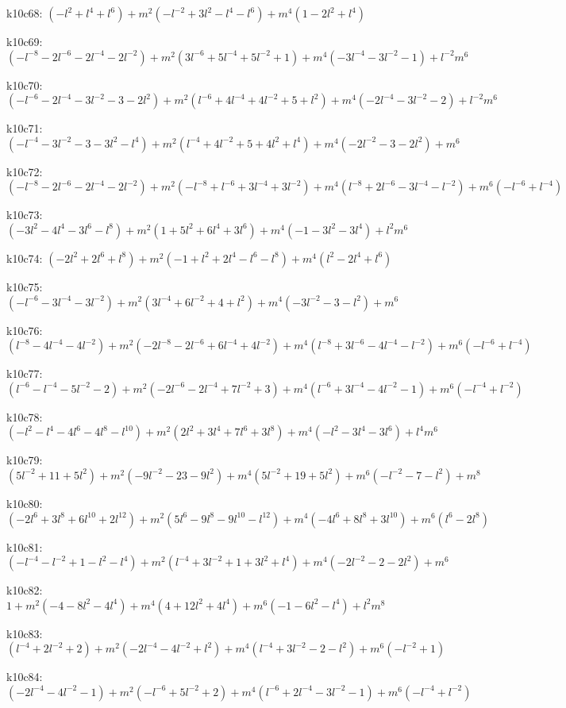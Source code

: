k10c68: $ (-l^{2}+l^{4}+l^{6})  +m^{2}(-l^{-2}+3l^{2}-l^{4}-l^{6})  +m^{4}(1-2l^{2}+l^{4}) $ 

k10c69: $ (-l^{-8}-2l^{-6}-2l^{-4}-2l^{-2})  +m^{2}(3l^{-6}+5l^{-4}+5l^{-2}+1)  +m^{4}(-3l^{-4}-3l^{-2}-1)  +l^{-2}m^{6} $ 

k10c70: $ (-l^{-6}-2l^{-4}-3l^{-2}-3-2l^{2})  +m^{2}(l^{-6}+4l^{-4}+4l^{-2}+5+l^{2})  +m^{4}(-2l^{-4}-3l^{-2}-2)  +l^{-2}m^{6} $ 

k10c71: $ (-l^{-4}-3l^{-2}-3-3l^{2}-l^{4})  +m^{2}(l^{-4}+4l^{-2}+5+4l^{2}+l^{4})  +m^{4}(-2l^{-2}-3-2l^{2})  +m^{6} $ 

k10c72: $ (-l^{-8}-2l^{-6}-2l^{-4}-2l^{-2})  +m^{2}(-l^{-8}+l^{-6}+3l^{-4}+3l^{-2})  +m^{4}(l^{-8}+2l^{-6}-3l^{-4}-l^{-2})  +m^{6}(-l^{-6}+l^{-4}) $ 

k10c73: $ (-3l^{2}-4l^{4}-3l^{6}-l^{8})  +m^{2}(1+5l^{2}+6l^{4}+3l^{6})  +m^{4}(-1-3l^{2}-3l^{4})  +l^{2}m^{6} $ 

k10c74: $ (-2l^{2}+2l^{6}+l^{8})  +m^{2}(-1+l^{2}+2l^{4}-l^{6}-l^{8})  +m^{4}(l^{2}-2l^{4}+l^{6}) $ 

k10c75: $ (-l^{-6}-3l^{-4}-3l^{-2})  +m^{2}(3l^{-4}+6l^{-2}+4+l^{2})  +m^{4}(-3l^{-2}-3-l^{2})  +m^{6} $ 

k10c76: $ (l^{-8}-4l^{-4}-4l^{-2})  +m^{2}(-2l^{-8}-2l^{-6}+6l^{-4}+4l^{-2})  +m^{4}(l^{-8}+3l^{-6}-4l^{-4}-l^{-2})  +m^{6}(-l^{-6}+l^{-4}) $ 

k10c77: $ (l^{-6}-l^{-4}-5l^{-2}-2)  +m^{2}(-2l^{-6}-2l^{-4}+7l^{-2}+3)  +m^{4}(l^{-6}+3l^{-4}-4l^{-2}-1)  +m^{6}(-l^{-4}+l^{-2}) $ 

k10c78: $ (-l^{2}-l^{4}-4l^{6}-4l^{8}-l^{10})  +m^{2}(2l^{2}+3l^{4}+7l^{6}+3l^{8})  +m^{4}(-l^{2}-3l^{4}-3l^{6})  +l^{4}m^{6} $ 

k10c79: $ (5l^{-2}+11+5l^{2})  +m^{2}(-9l^{-2}-23-9l^{2})  +m^{4}(5l^{-2}+19+5l^{2})  +m^{6}(-l^{-2}-7-l^{2})  +m^{8} $ 

k10c80: $ (-2l^{6}+3l^{8}+6l^{10}+2l^{12})  +m^{2}(5l^{6}-9l^{8}-9l^{10}-l^{12})  +m^{4}(-4l^{6}+8l^{8}+3l^{10})  +m^{6}(l^{6}-2l^{8}) $ 

k10c81: $ (-l^{-4}-l^{-2}+1-l^{2}-l^{4})  +m^{2}(l^{-4}+3l^{-2}+1+3l^{2}+l^{4})  +m^{4}(-2l^{-2}-2-2l^{2})  +m^{6} $ 

k10c82: $ 1  +m^{2}(-4-8l^{2}-4l^{4})  +m^{4}(4+12l^{2}+4l^{4})  +m^{6}(-1-6l^{2}-l^{4})  +l^{2}m^{8} $ 

k10c83: $ (l^{-4}+2l^{-2}+2)  +m^{2}(-2l^{-4}-4l^{-2}+l^{2})  +m^{4}(l^{-4}+3l^{-2}-2-l^{2})  +m^{6}(-l^{-2}+1) $ 

k10c84: $ (-2l^{-4}-4l^{-2}-1)  +m^{2}(-l^{-6}+5l^{-2}+2)  +m^{4}(l^{-6}+2l^{-4}-3l^{-2}-1)  +m^{6}(-l^{-4}+l^{-2}) $ 

